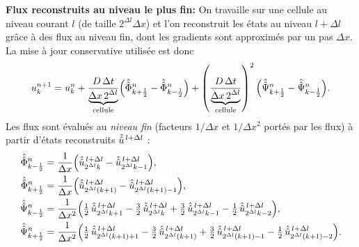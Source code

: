 \textbf{Flux reconstruits au niveau le plus fin: }
On travaille sur une cellule au niveau courant $l$ (de taille $2^{\Delta l}\Delta x$) et l'on reconstruit les états au niveau $l+\Delta l$ grâce à des flux
au niveau fin, dont les gradients sont approximés par un pas $\Delta x$. La mise à jour conservative utilisée est donc
\begin{align}
u_k^{n+1}
= u_k^{n}
+ \frac{D\,\Delta t}{\underbrace{\Delta x\,2^{\Delta l}}_{\text{cellule}}}\Bigl(\hat{\hat{\Phi}}_{k+\frac12}^n-\hat{\hat{\Phi}}_{k-\frac12}^n\Bigr)
+ \left(\frac{D\,\Delta t}{\underbrace{\Delta x\,2^{\Delta l}}_{\text{cellule}}}\right)^2 \Bigl(\hat{\hat{\Psi}}_{k+\frac12}^n-\hat{\hat{\Psi}}_{k-\frac12}^n\Bigr).
\end{align}
Les flux sont évalués au \emph{niveau fin} (facteurs $1/\Delta x$ et $1/\Delta x^2$ portés par les flux) à partir d'états reconstruits $\hat{\hat{u}}^{\,l+\Delta l}$ :
\begin{align}
\hat{\hat{\Phi}}_{k-\frac12}^n
&= \frac{1}{\Delta x}\Bigl(
\hat{\hat{u}}^{\,l+\Delta l}_{2^{\Delta l}k}
-\hat{\hat{u}}^{\,l+\Delta l}_{2^{\Delta l}k-1}\Bigr),\\
\hat{\hat{\Phi}}_{k+\frac12}^n
&= \frac{1}{\Delta x}\Bigl(
\hat{\hat{u}}^{\,l+\Delta l}_{2^{\Delta l}(k+1)}
-\hat{\hat{u}}^{\,l+\Delta l}_{2^{\Delta l}(k+1)-1}\Bigr),\\
\hat{\hat{\Psi}}_{k-\frac12}^n
&= \frac{1}{\Delta x^2}\Bigl(
\tfrac12\,\hat{\hat{u}}^{\,l+\Delta l}_{2^{\Delta l}k+1}
-\tfrac32\,\hat{\hat{u}}^{\,l+\Delta l}_{2^{\Delta l}k}
+\tfrac32\,\hat{\hat{u}}^{\,l+\Delta l}_{2^{\Delta l}k-1}
-\tfrac12\,\hat{\hat{u}}^{\,l+\Delta l}_{2^{\Delta l}k-2}\Bigr),\\
\hat{\hat{\Psi}}_{k+\frac12}^n
&= \frac{1}{\Delta x^2}\Bigl(
\tfrac12\,\hat{\hat{u}}^{\,l+\Delta l}_{2^{\Delta l}(k+1)+1}
-\tfrac32\,\hat{\hat{u}}^{\,l+\Delta l}_{2^{\Delta l}(k+1)}
+\tfrac32\,\hat{\hat{u}}^{\,l+\Delta l}_{2^{\Delta l}(k+1)-1}
-\tfrac12\,\hat{\hat{u}}^{\,l+\Delta l}_{2^{\Delta l}(k+1)-2}\Bigr).
\end{align}

